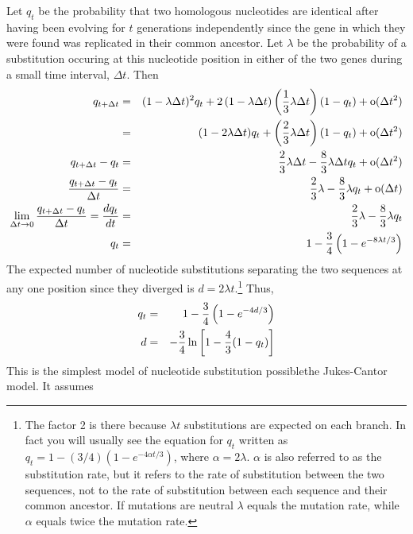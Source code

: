 \documentclass[12pt]{article}
\begin{document}
Let $q_t$ be the probability that two homologous nucleotides are
identical after having been evolving for $t$ generations independently
since the gene in which they were found was replicated in their common
ancestor. Let $\lambda$ be the probability of a substitution occuring
at this nucleotide position in either of the two genes during a small
time interval, $\Delta t$. Then
\begin{eqnarray*}
q_{t+\Delta t} &=& (1 - \lambda\Delta t)^2q_t
                  + 2\left(1 - \lambda\Delta t\right)\left({1 \over
                           3}\lambda\Delta t\right)(1 - q_t)
                  + \hbox{o}(\Delta t^2) \\
               &=& (1 - 2\lambda\Delta t)q_t + \left({2 \over 3}\lambda
                                                    \Delta t\right)
                                              (1 - q_t) 
                  + \hbox{o}(\Delta t^2) \\
q_{t+\Delta t} - q_t &=& {2 \over 3}\lambda\Delta t - {8 \over
                           3}\lambda\Delta tq_t + \hbox{o}(\Delta t^2) \\
{q_{t+\Delta t} - q_t \over \Delta t} &=& {2 \over 3}\lambda - {8 \over
3}\lambda q_t + \hbox{o}(\Delta t) \\
\lim_{\Delta t\to 0}{q_{t+\Delta t} - q_t \over \Delta t}  = {dq_t \over dt} &=& {2 \over 3}\lambda - {8
\over 3}\lambda q_t \\
q_t &=& 1 - {3 \over 4}\left(1 - e^{-8\lambda t/3}\right) \\
\end{eqnarray*}
The expected number of nucleotide substitutions separating the two
sequences at any one position since they diverged is $d = 2\lambda
t$.\footnote{The factor 2 is there because $\lambda t$ substitutions
  are expected on each branch. In fact you will usually see the
  equation for $q_t$ written as $q_t = 1 - (3/4)\left(1 - e^{-4\alpha
      t/3}\right)$, where $\alpha = 2\lambda$. $\alpha$ is also
  referred to as the substitution rate, but it refers to the rate of
  substitution between the two sequences, not to the rate of
  substitution between each sequence and their common ancestor. If
  mutations are neutral $\lambda$ equals the mutation rate, while
  $\alpha$ equals twice the mutation rate.} Thus,
\begin{eqnarray*}
q_t &=& 1 - {3 \over 4}\left(1 - e^{-4d/3}\right) \\
d   &=& -{3 \over 4}\ln\left[1 - {4 \over 3}(1 - q_t)\right] \\
\end{eqnarray*}
This is the simplest model of nucleotide substitution
possible{\dash}the Jukes-Cantor model. It assumes
\end{document}
